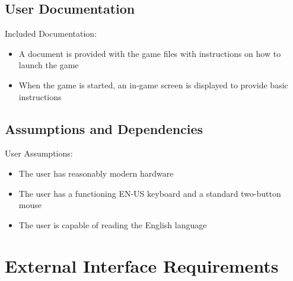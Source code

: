 \documentclass{article}
\begin{document}
	\subsection{User Documentation}
		Included Documentation:
		\begin{itemize}
			\item A document is provided with the game files with instructions on how to launch the game
			\item When the game is started, an in-game screen is displayed to provide basic instructions
		\end{itemize}
	
	\subsection{Assumptions and Dependencies}
		User Assumptions:
		\begin{itemize}
			\item The user has reasonably modern hardware
			\item The user has a functioning EN-US keyboard and a standard two-button mouse
			\item The user is capable of reading the English language
		\end{itemize}
\section{External Interface Requirements}
\end{document}
